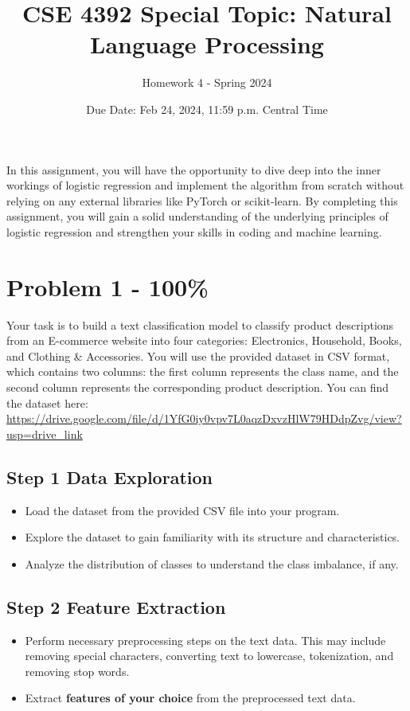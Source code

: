 \documentclass{article}
\begin{document}
\title{CSE 4392 Special Topic: Natural Language Processing}
\author{Homework 4 - Spring 2024}
\date{Due Date: Feb 24, 2024, 11:59 p.m. Central Time}
\maketitle
\thispagestyle{fancy}


In this assignment, you will have the opportunity to dive deep into the inner workings of logistic regression and implement the algorithm from scratch without relying on any external libraries like PyTorch or scikit-learn.
By completing this assignment, you will gain a solid understanding of the underlying principles of logistic regression and strengthen your skills in coding and machine learning.

\section*{Problem 1 - 100\%}
Your task is to build a text classification model to classify product descriptions from an E-commerce website into four categories: Electronics, Household, Books, and Clothing \& Accessories. 
You will use the provided dataset in CSV format, which contains two columns: the first column represents the class name, and the second column represents the corresponding product description.
You can find the dataset here: \url{https://drive.google.com/file/d/1YfG0iy0vpv7L0aqzDxvzHlW79HDdpZvg/view?usp=drive_link}

\subsection*{Step 1 Data Exploration}
\begin{itemize}
    \item Load the dataset from the provided CSV file into your program.
    \item Explore the dataset to gain familiarity with its structure and characteristics.
    \item Analyze the distribution of classes to understand the class imbalance, if any.
\end{itemize}

\subsection*{Step 2 Feature Extraction}
\begin{itemize}
    \item Perform necessary preprocessing steps on the text data. This may include removing special characters, converting text to lowercase, tokenization, and removing stop words.
    \item Extract \textbf{features of your choice} from the preprocessed text 
data.
\end{itemize}
\end{document}
